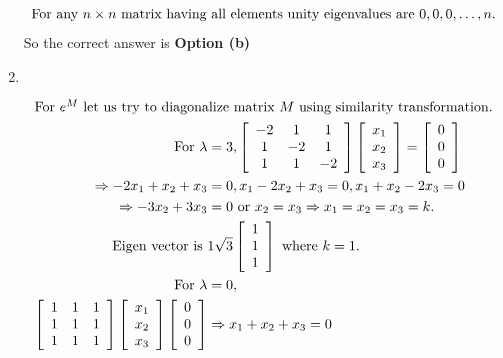 \begin{enumerate}
\begin{answer}
\begin{align*}
	\intertext{For any $n \times n$ matrix having all elements unity eigenvalues are $0,0,0, \ldots, n$.}
		\end{align*}
	So the correct answer is \textbf{Option (b)}		
	\end{answer}
	\item $\left. \right. $	
	\begin{answer}
		\begin{align*}
		\intertext{For $e^{M}$ let us try to diagonalize matrix $M$ using similarity transformation.}
		\text{For }\lambda&=3,\left[\begin{array}{ccc}-2 & 1 & 1 \\ 1 & -2 & 1 \\ 1 & 1 & -2\end{array}\right]\left[\begin{array}{l}x_{1} \\ x_{2} \\ x_{3}\end{array}\right]=\left[\begin{array}{l}0 \\ 0 \\ 0\end{array}\right]\\
		\Rightarrow-2 x_{1}+x_{2}+x_{3}&=0, x_{1}-2 x_{2}+x_{3}=0, x_{1}+x_{2}-2 x_{3}=0 \\
		\Rightarrow-3 x_{2}+3 x_{3}&=0 \text { or } x_{2}=x_{3} \Rightarrow x_{1}=x_{2}=x_{3}=k .\\
		\text{Eigen vector is }&1 \sqrt{3}\left[\begin{array}{l}1 \\ 1 \\ 1\end{array}\right]\text{ where }k=1.\\
	\text{	For }\lambda&=0,\\
		\left[\begin{array}{lll}1 & 1 & 1 \\ 1 & 1 & 1 \\ 1 & 1 & 1\end{array}\right]\left[\begin{array}{l}x_{1} \\ x_{2} \\ x_{3}\end{array}\right]\left[\begin{array}{l}0 \\ 0 \\ 0\end{array}\right] &\Rightarrow x_{1}+x_{2}+x_{3}=0\\

\end{align*}
\end{answer}
\end{enumerate}

